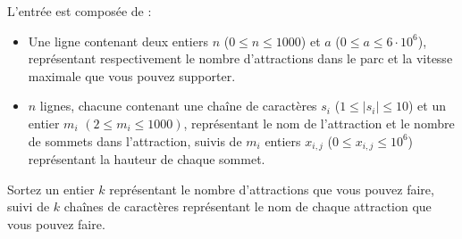 \begin{Input}
    L'entrée est composée de :
    \begin{itemize}
        \item Une ligne contenant deux entiers $n$ ($0 \leq n \leq 1000$) et $a$ ($0 \leq a \leq 6 \cdot 10^6$), représentant respectivement le nombre d'attractions dans le parc et la vitesse maximale que vous pouvez supporter.
        \item $n$ lignes, chacune contenant une chaîne de caractères $s_i$ ($1 \leq |s_i| \leq 10$) et un entier $m_i$ $(2 \leq m_i \leq 1000)$, représentant le nom de l'attraction et le nombre de sommets dans l'attraction, suivis de $m_i$ entiers $x_{i,j}$ ($0 \leq x_{i,j} \leq 10^6$) représentant la hauteur de chaque sommet.
    \end{itemize}
\end{Input}

\begin{Output}
    Sortez un entier $k$ représentant le nombre d'attractions que vous pouvez faire, suivi de $k$ chaînes de caractères représentant le nom de chaque attraction que vous pouvez faire.
\end{Output}
